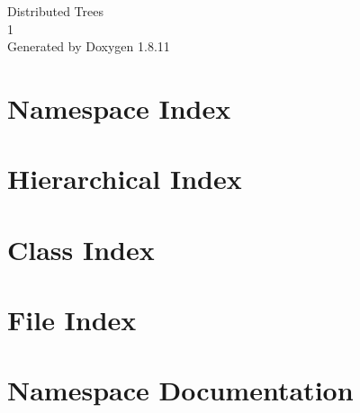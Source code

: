 \documentclass[twoside]{book}
\newcommand{\+}{\discretionary{\mbox{\scriptsize$\hookleftarrow$}}{}{}}
\newcommand{\clearemptydoublepage}{%
  \newpage{\pagestyle{empty}\cleardoublepage}%
}
\begin{document}
\hypersetup{pageanchor=false,
             bookmarksnumbered=true,
             pdfencoding=unicode
            }
\begin{titlepage}
\vspace*{7cm}
\begin{center}%
{\Large Distributed Trees \\[1ex]\large 1 }\\
\vspace*{1cm}
{\large Generated by Doxygen 1.8.11}\\
\end{center}
\end{titlepage}
\clearemptydoublepage
\tableofcontents
\clearemptydoublepage
{}
\hypersetup{pageanchor=true}

\chapter{Namespace Index}

\chapter{Hierarchical Index}

\chapter{Class Index}

\chapter{File Index}

\chapter{Namespace Documentation}


\end{document}
